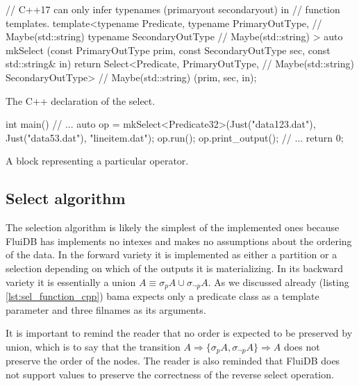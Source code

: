 \begin{code}
\begin{cppcode}
// C++17 can only infer typenames (primaryout secondaryout) in
// function templates.
template<typename Predicate,
         typename PrimaryOutType,   // Maybe(std::string)
         typename SecondaryOutType  // Maybe(std::string)
         >
auto mkSelect (const PrimaryOutType prim,
               const SecondaryOutType sec,
               const std::string& in) {
  return Select<Predicate,
                PrimaryOutType,   // Maybe(std::string)
                SecondaryOutType> // Maybe(std::string)
    (prim, sec, in);
}
\end{cppcode}
\caption{\label{lst:sel_function_cpp}The C++ declaration of the select.}
\end{code}


\begin{code}
\begin{cppcode}
int main() {
  // ...
  {
    auto op = mkSelect<Predicate32>(Just("data123.dat"), Just("data53.dat"),
                                    "lineitem.dat");
    op.run();
    op.print_output();
  }
  // ...
  return 0;
}
\end{cppcode}
  \caption{\label{lst:gen_out_code}A block representing a particular
    operator.}
\end{code}


\subsection{Select algorithm}

The selection algorithm is likely the simplest of the implemented ones
because FluiDB has implements no intexes and makes no assumptions
about the ordering of the data. In the forward variety it is
implemented as either a partition or a selection depending on which of
the outputs it is materializing. In its backward variety it is
essentially a union \(A \equiv \sigma_p A \cup \sigma_{\neg p} A\). As
we discussed already (listing \ref{lst:sel_function_cpp}) bama expects
only a predicate class as a template parameter and three filnames as
its arguments.

It is important to remind the reader that no order is expected to be
preserved by union, which is to say that the transition \(A
\Rightarrow \{\sigma_p A, \sigma_{\neg p} A\} \Rightarrow A\) does not
preserve the order of the nodes. The reader is also reminded that
FluiDB does not support  values to preserve the correctness of
the reverse select operation.



